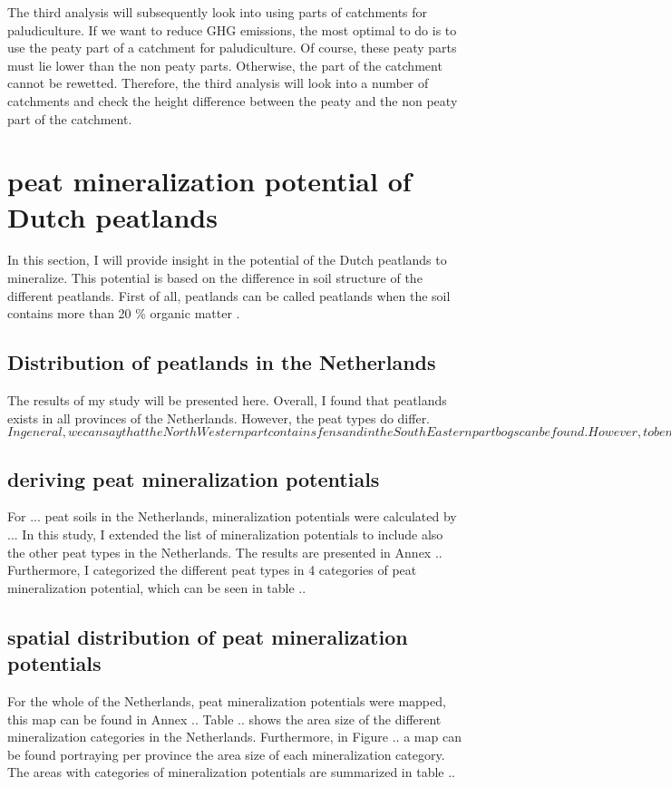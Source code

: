 \documentclass[a4paper,12pt]{scrbook}
\begin{document}
The third analysis will subsequently look into using parts of catchments for paludiculture. If we want to reduce GHG emissions, the most optimal to do is to use the peaty part of a catchment for paludiculture. Of course, these peaty parts must lie lower than the non peaty parts. Otherwise, the part of the catchment cannot be rewetted. Therefore, the third analysis will look into a number of catchments and check the height difference between the peaty and the non peaty part of the catchment.

\section{peat mineralization potential of Dutch peatlands}

In this section, I will provide insight in the potential of the Dutch peatlands to mineralize. This potential is based on the difference in soil structure of the different peatlands. First of all, peatlands can be called peatlands when the soil contains more than 20 \% organic matter \citep{}. 

\subsection{Distribution of peatlands in the Netherlands}

The results of my study will be presented here. Overall, I found that peatlands exists in all provinces of the Netherlands. However, the peat types do differ. 
$In general, we can say that the North Western part contains fens and in the South Eastern part bogs can be found. However, to be more specific, Table .. shows the distribution of the main peat types over the different provinces in the Netherlands.$

\subsection{deriving peat mineralization potentials}
For ... peat soils in the Netherlands, mineralization potentials were calculated by ...  In this study, I extended the list of mineralization potentials to include also the other peat types in the Netherlands. The results are presented in Annex .. Furthermore, I categorized the different peat types in 4 categories of peat mineralization potential, which can be seen in table ..

\subsection{spatial distribution of peat mineralization potentials}
For the whole of the Netherlands, peat mineralization potentials were mapped, this map can be found in Annex .. Table .. shows the area size of the different mineralization categories in the Netherlands. Furthermore, in Figure .. a map can be found portraying per province the area size of each mineralization category. The areas with categories of mineralization potentials are summarized in table ..
\end{document}
